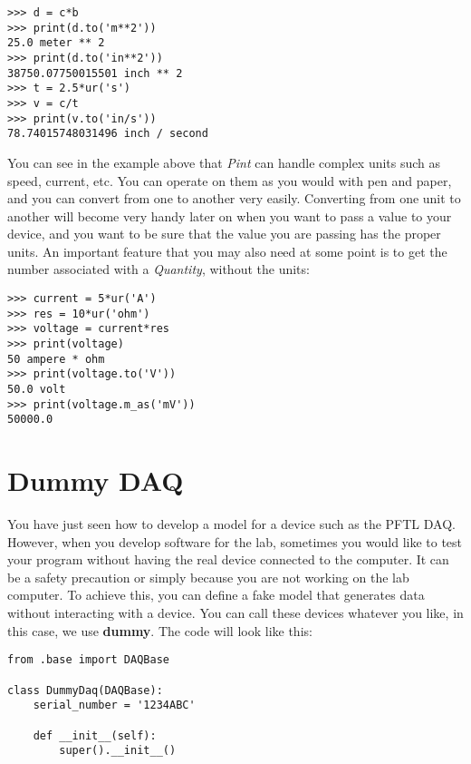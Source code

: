 \begin{verbatim}
>>> d = c*b
>>> print(d.to('m**2'))
25.0 meter ** 2
>>> print(d.to('in**2'))
38750.07750015501 inch ** 2
>>> t = 2.5*ur('s')
>>> v = c/t
>>> print(v.to('in/s'))
78.74015748031496 inch / second
\end{verbatim}

You can see in the example above that \emph{Pint} can handle complex
units such as speed, current, etc. You can operate on them as you would
with pen and paper, and you can convert from one to another very easily.
Converting from one unit to another will become very handy later on when
you want to pass a value to your device, and you want to be sure that
the value you are passing has the proper units. An important feature
that you may also need at some point is to get the number associated
with a \emph{Quantity}, without the units:

\begin{verbatim}
>>> current = 5*ur('A')
>>> res = 10*ur('ohm')
>>> voltage = current*res
>>> print(voltage)
50 ampere * ohm
>>> print(voltage.to('V'))
50.0 volt
>>> print(voltage.m_as('mV'))
50000.0
\end{verbatim}



\section{Dummy DAQ}\label{dummy-daq}
You have just seen how to develop a model for a device such as the
{PFTL} {DAQ}. However, when you develop software for the lab, sometimes
you would like to test your program without having the real device
connected to the computer. It can be a safety precaution or simply
because you are not working on the lab computer. To achieve this, you
can define a fake model that generates data without interacting with a
device. You can call these devices whatever you like, in this case, we
use \textbf{dummy}. The code will look like this:

\begin{verbatim}
from .base import DAQBase

class DummyDaq(DAQBase):
    serial_number = '1234ABC'
    
    def __init__(self):
        super().__init__()
\end{verbatim}

